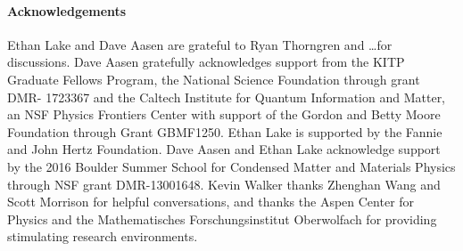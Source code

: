  
 \paragraph{Acknowledgements}
Ethan Lake and Dave Aasen are grateful to Ryan Thorngren and \dots for discussions. Dave Aasen gratefully acknowledges support from the KITP Graduate Fellows Program, the National Science Foundation through grant DMR- 1723367
and the Caltech Institute for Quantum Information and Matter, 
an NSF Physics Frontiers Center with support of the Gordon and Betty Moore Foundation through Grant GBMF1250.
Ethan Lake is supported by the Fannie and John Hertz Foundation.
Dave Aasen and Ethan Lake acknowledge support by the 2016 Boulder Summer School for Condensed
Matter and Materials Physics through NSF grant DMR-13001648.
Kevin Walker thanks Zhenghan Wang and Scott Morrison for helpful conversations, and
thanks the Aspen Center for Physics and  the Mathematisches Forschungsinstitut Oberwolfach
for providing stimulating research environments.

